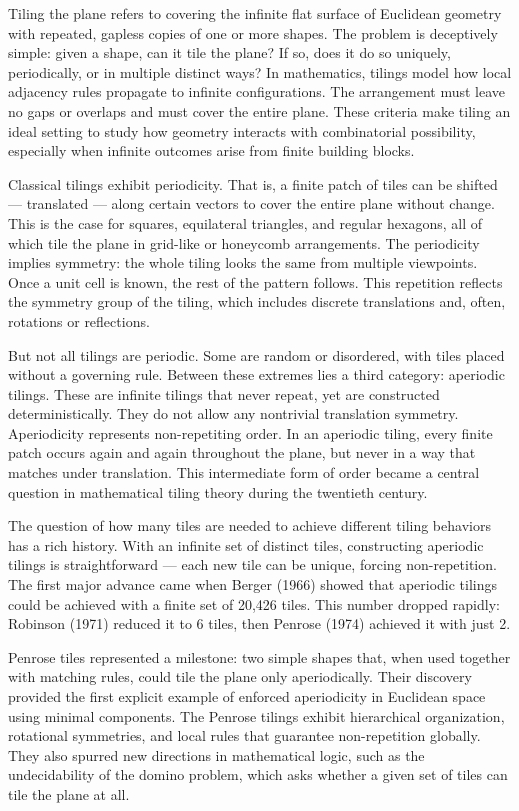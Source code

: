 Tiling the plane refers to covering the infinite flat surface of Euclidean geometry with repeated, gapless copies of one or more shapes. The problem is deceptively simple: given a shape, can it tile the plane? If so, does it do so uniquely, periodically, or in multiple distinct ways? In mathematics, tilings model how local adjacency rules propagate to infinite configurations. The arrangement must leave no gaps or overlaps and must cover the entire plane. These criteria make tiling an ideal setting to study how geometry interacts with combinatorial possibility, especially when infinite outcomes arise from finite building blocks.

Classical tilings exhibit periodicity. That is, a finite patch of tiles can be shifted — translated — along certain vectors to cover the entire plane without change. This is the case for squares, equilateral triangles, and regular hexagons, all of which tile the plane in grid-like or honeycomb arrangements. The periodicity implies symmetry: the whole tiling looks the same from multiple viewpoints. Once a unit cell is known, the rest of the pattern follows. This repetition reflects the symmetry group of the tiling, which includes discrete translations and, often, rotations or reflections.

But not all tilings are periodic. Some are random or disordered, with tiles placed without a governing rule. Between these extremes lies a third category: aperiodic tilings. These are infinite tilings that never repeat, yet are constructed deterministically. They do not allow any nontrivial translation symmetry. Aperiodicity represents non-repetiting order. In an aperiodic tiling, every finite patch occurs again and again throughout the plane, but never in a way that matches under translation. This intermediate form of order became a central question in mathematical tiling theory during the twentieth century.

The question of how many tiles are needed to achieve different tiling behaviors has a rich history. With an infinite set of distinct tiles, constructing aperiodic tilings is straightforward — each new tile can be unique, forcing non-repetition. The first major advance came when Berger (1966) showed that aperiodic tilings could be achieved with a finite set of 20,426 tiles. This number dropped rapidly: Robinson (1971) reduced it to 6 tiles, then Penrose (1974) achieved it with just 2.

Penrose tiles represented a milestone: two simple shapes that, when used together with matching rules, could tile the plane only aperiodically. Their discovery provided the first explicit example of enforced aperiodicity in Euclidean space using minimal components. The Penrose tilings exhibit hierarchical organization, rotational symmetries, and local rules that guarantee non-repetition globally. They also spurred new directions in mathematical logic, such as the undecidability of the domino problem, which asks whether a given set of tiles can tile the plane at all.


